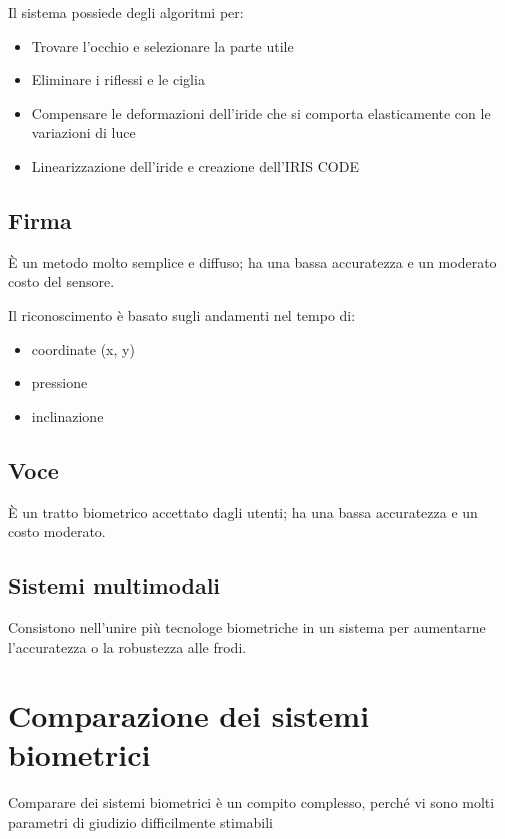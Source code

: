 \documentclass{report}
\begin{document}
\noindent Il sistema possiede degli algoritmi per:
\begin{itemize}
    \item Trovare l'occhio e selezionare la parte utile
    \item Eliminare i riflessi e le ciglia
    \item Compensare le deformazioni dell'iride che si comporta elasticamente con le variazioni di luce
    \item Linearizzazione dell'iride e creazione dell'IRIS CODE
\end{itemize}

\newpage
\section{Firma}

È un metodo molto semplice e diffuso; ha una bassa accuratezza e un moderato costo del sensore.

\noindent Il riconoscimento è basato sugli andamenti nel tempo di:
\begin{itemize}
    \item coordinate (x, y)
    \item pressione
    \item inclinazione
\end{itemize}

\section{Voce}

È un tratto biometrico accettato dagli utenti; ha una bassa accuratezza e un costo moderato.

\section{Sistemi multimodali}

Consistono nell'unire più tecnologe biometriche in un sistema per aumentarne l'accuratezza o la robustezza alle frodi.









\chapter{Comparazione dei sistemi biometrici}


Comparare dei sistemi biometrici è un compito complesso, perché vi sono molti parametri di giudizio difficilmente stimabili
\end{document}
